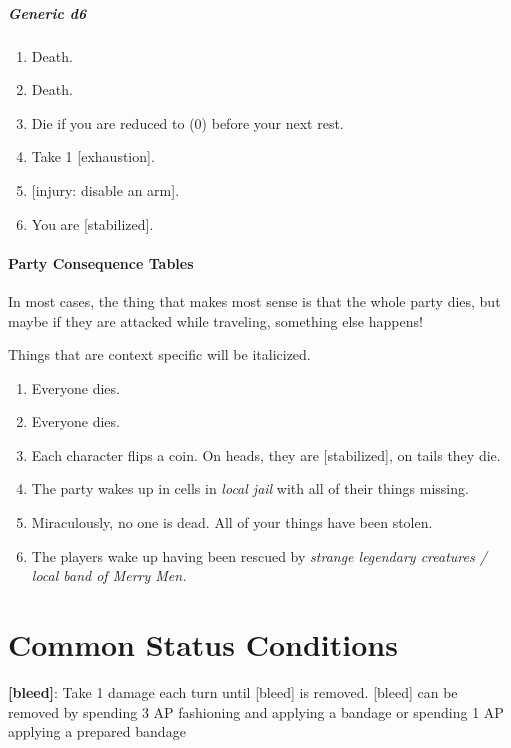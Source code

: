 \documentclass[
  letterpaper,
  DIV=11,
  numbers=noendperiod]{scrartcl}
\let\oldparagraph\paragraph
\renewcommand{\paragraph}[1]{\oldparagraph{#1}\mbox{}}
\let\oldsubparagraph\subparagraph
\renewcommand{\subparagraph}[1]{\oldsubparagraph{#1}\mbox{}}
\providecommand{\tightlist}{%
  \setlength{\itemsep}{0pt}\setlength{\parskip}{0pt}}\usepackage{longtable,booktabs,array}
\begin{document}
\subparagraph{Generic d6}\label{generic-d6}

\begin{enumerate}
\def\labelenumi{\arabic{enumi}.}
\tightlist
\item
  Death.
\item
  Death.
\item
  Die if you are reduced to (0) before your next rest.
\item
  Take 1 {[}exhaustion{]}.
\item
  {[}injury: disable an arm{]}.
\item
  You are {[}stabilized{]}.
\end{enumerate}

\paragraph{Party Consequence Tables}\label{party-consequence-tables}

In most cases, the thing that makes most sense is that the whole party
dies, but maybe if they are attacked while traveling, something else
happens!

Things that are context specific will be italicized.

\begin{enumerate}
\def\labelenumi{\arabic{enumi}.}
\tightlist
\item
  Everyone dies.
\item
  Everyone dies.
\item
  Each character flips a coin. On heads, they are {[}stabilized{]}, on
  tails they die.
\item
  The party wakes up in cells in \emph{local jail} with all of their
  things missing.
\item
  Miraculously, no one is dead. All of your things have been stolen.
\item
  The players wake up having been rescued by \emph{strange legendary
  creatures / local band of Merry Men.}
\end{enumerate}

\section{Common Status Conditions}\label{common-status-conditions}

\textbf{{[}bleed{]}}: Take 1 damage each turn until {[}bleed{]} is
removed. {[}bleed{]} can be removed by spending 3 AP fashioning and
applying a bandage or spending 1 AP applying a prepared bandage
\end{document}
